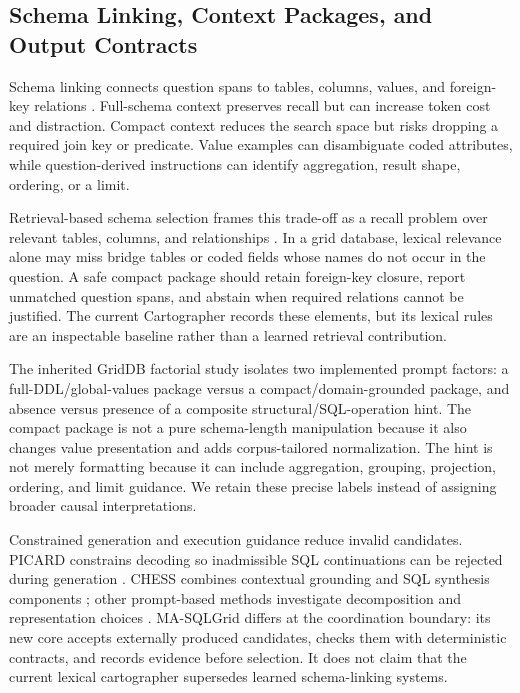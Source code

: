 \documentclass[applsci,article,submit,moreauthors]{Definitions/mdpi}
\newcommand{\masql}{MA-SQLGrid}
\begin{document}
\subsection{Schema Linking, Context Packages, and Output Contracts}

Schema linking connects question spans to tables, columns, values, and foreign-key relations \cite{wang2020ratsql,lei2020reexamining,liu2022semantic}. Full-schema context preserves recall but can increase token cost and distraction. Compact context reduces the search space but risks dropping a required join key or predicate. Value examples can disambiguate coded attributes, while question-derived instructions can identify aggregation, result shape, ordering, or a limit.

Retrieval-based schema selection frames this trade-off as a recall problem over relevant tables, columns, and relationships \cite{bozdemir2026schema}. In a grid database, lexical relevance alone may miss bridge tables or coded fields whose names do not occur in the question. A safe compact package should retain foreign-key closure, report unmatched question spans, and abstain when required relations cannot be justified. The current Cartographer records these elements, but its lexical rules are an inspectable baseline rather than a learned retrieval contribution.

The inherited GridDB factorial study isolates two implemented prompt factors: a full-DDL/global-values package versus a compact/domain-grounded package, and absence versus presence of a composite structural/SQL-operation hint. The compact package is not a pure schema-length manipulation because it also changes value presentation and adds corpus-tailored normalization. The hint is not merely formatting because it can include aggregation, grouping, projection, ordering, and limit guidance. We retain these precise labels instead of assigning broader causal interpretations.

Constrained generation and execution guidance reduce invalid candidates. PICARD constrains decoding so inadmissible SQL continuations can be rejected during generation \cite{scholak2021picard}. CHESS combines contextual grounding and SQL synthesis components \cite{talaei2024chess}; other prompt-based methods investigate decomposition and representation choices \cite{nan2023enhancing,sun2023sqlprompt,pourreza2023dinsql}. \masql{} differs at the coordination boundary: its new core accepts externally produced candidates, checks them with deterministic contracts, and records evidence before selection. It does not claim that the current lexical cartographer supersedes learned schema-linking systems.
\end{document}
